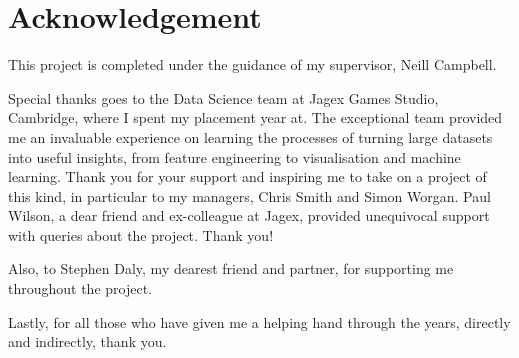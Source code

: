\chapter*{Acknowledgement}
This project is completed under the guidance of my supervisor, Neill Campbell.  

Special thanks goes to the Data Science team at Jagex Games Studio, Cambridge,  where I spent my placement year at. The exceptional team provided me an invaluable experience on learning the processes of turning large datasets into useful insights, from feature engineering to visualisation and machine learning. Thank you for your support and inspiring me to take on a project of this kind, in particular to my managers, Chris Smith and Simon Worgan. Paul Wilson, a dear friend and ex-colleague at Jagex, provided unequivocal support with queries about the project. Thank you! 

Also, to Stephen Daly, my dearest friend and partner, for supporting me throughout the project.

Lastly, for all those who have given me a helping hand through the years, directly and indirectly, thank you.
